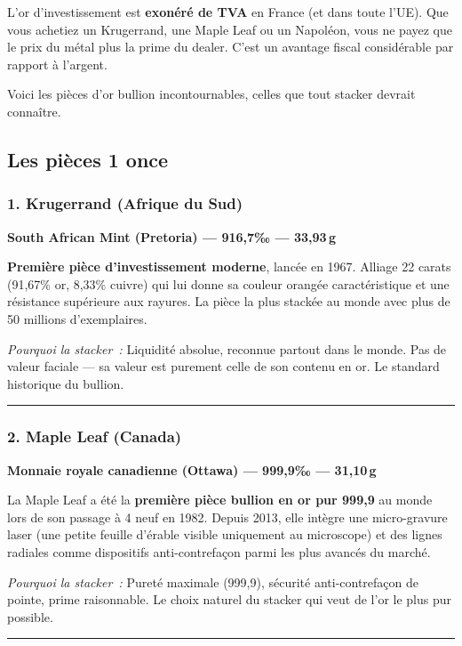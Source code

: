 \documentclass[14pt,a4paper]{extarticle}
\newcommand{\permil}{‰}
\newcommand{\goldsep}{%
  \begin{center}
    \textcolor{gold}{\rule{6cm}{0.4pt}}
  \end{center}
}
\begin{document}
L'or d'investissement est \textbf{exonéré de TVA} en France (et dans toute l'UE). Que vous achetiez un Krugerrand, une Maple Leaf ou un Napoléon, vous ne payez que le prix du métal plus la prime du dealer. C'est un avantage fiscal considérable par rapport à l'argent.

Voici les pièces d'or bullion incontournables, celles que tout stacker devrait connaître.

\subsection{Les pièces 1 once}

\subsubsection{1. Krugerrand (Afrique du Sud)}

\textbf{South African Mint (Pretoria) --- 916,7\permil{} --- 33,93\,g}

\textbf{Première pièce d'investissement moderne}, lancée en 1967. Alliage 22 carats (91,67\% or, 8,33\% cuivre) qui lui donne sa couleur orangée caractéristique et une résistance supérieure aux rayures. La pièce la plus stackée au monde avec plus de 50 millions d'exemplaires.

\textit{Pourquoi la stacker~:} Liquidité absolue, reconnue partout dans le monde. Pas de valeur faciale --- sa valeur est purement celle de son contenu en or. Le standard historique du bullion.


\goldsep

\subsubsection{2. Maple Leaf (Canada)}

\textbf{Monnaie royale canadienne (Ottawa) --- 999,9\permil{} --- 31,10\,g}

La Maple Leaf a été la \textbf{première pièce bullion en or pur 999,9} au monde lors de son passage à 4 neuf en 1982. Depuis 2013, elle intègre une micro-gravure laser (une petite feuille d'érable visible uniquement au microscope) et des lignes radiales comme dispositifs anti-contrefaçon parmi les plus avancés du marché.

\textit{Pourquoi la stacker~:} Pureté maximale (999,9), sécurité anti-contrefaçon de pointe, prime raisonnable. Le choix naturel du stacker qui veut de l'or le plus pur possible.


\goldsep
\end{document}
